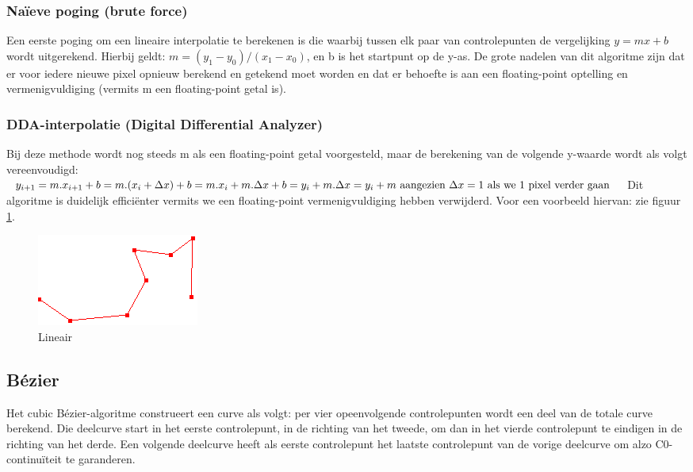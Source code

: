 \documentclass[a4paper,11pt,oneside, titlepage]{article}
\begin{document}
\subsubsection{Na\"ieve poging (brute force) \label{snp1}}
Een eerste poging om een lineaire interpolatie te berekenen is die waarbij tussen elk paar van controlepunten
de vergelijking \begin{math}y = mx + b\end{math} wordt uitgerekend.
Hierbij geldt: \begin{math}m = (y_1-y_0)/(x_1-x_0)\end{math}, en b is het
startpunt op de y-as. De grote nadelen van dit algoritme zijn dat er voor iedere nieuwe
pixel opnieuw berekend en getekend moet worden en dat er behoefte is aan een floating-point optelling en 
vermenigvuldiging (vermits m een floating-point getal is).
\subsubsection{DDA-interpolatie (Digital Differential Analyzer) \label{sdda}}
Bij deze methode wordt nog steeds m als een floating-point getal voorgesteld, maar de berekening van
de volgende y-waarde wordt als volgt vereenvoudigd:
\begin{math}
y_{i+1} = m.x_{i+1} + b\newline
= m.(x_i + \Delta x) + b\newline
= m.x_i + m.\Delta x + b\newline
= y_i + m.\Delta x\newline
= y_i + m \textrm{ aangezien } \Delta x = 1 \textrm{ als we 1 pixel verder gaan } \newline
\end{math}
Dit algoritme is duidelijk effici\"enter vermits we een floating-point vermenigvuldiging hebben 
verwijderd. Voor een voorbeeld hiervan: zie figuur \ref{lineair}.
\begin{figure}[htbp]
\centering
\includegraphics[scale=0.4]{./screenies2/lineair.png}
\caption{Lineair}\label{lineair}
\end{figure}
\subsection{B\'ezier \label{sb}}
Het cubic B\'ezier-algoritme construeert een curve als volgt: per vier opeenvolgende controlepunten wordt een deel van de totale curve berekend.
Die deelcurve start in het eerste controlepunt, in de richting van het tweede, om dan in het vierde controlepunt te eindigen in de richting van het derde. Een volgende 
deelcurve heeft als eerste controlepunt het laatste controlepunt van de vorige deelcurve om alzo C0-continu\"iteit te garanderen.
\end{document}
